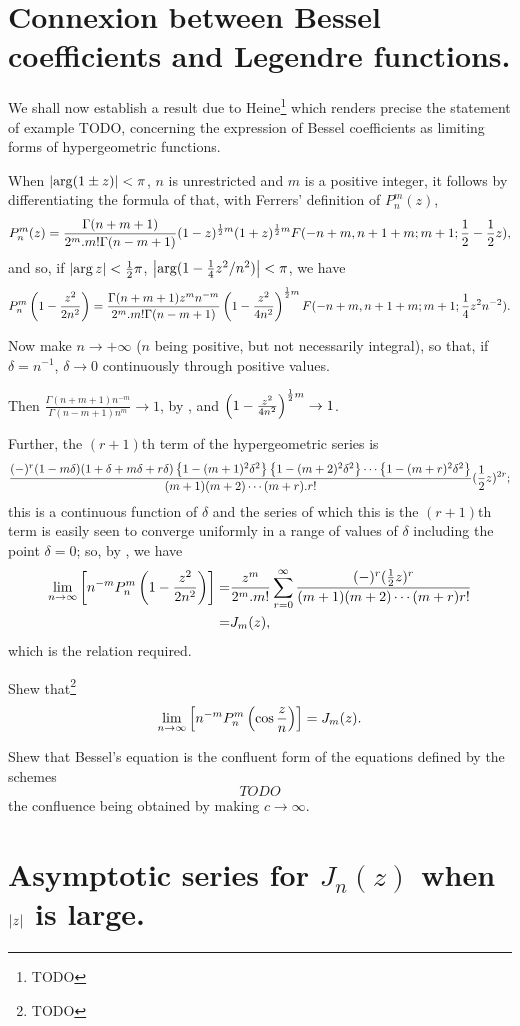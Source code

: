 \documentclass{book}
\begin{document}
\section{Connexion between Bessel coefficients and Legendre
  functions.}
We shall now establish a result due to Heine\footnote{TODO} which
renders precise the statement of  example
TODO, concerning the expression of Bessel coefficients as limiting
forms of hypergeometric functions.

When $\left| \arg(1\pm z) \right| < \pi$, $n$ is unrestricted and $m$ is a
positive integer, it follows by differentiating the formula of
 that, with Ferrers' definition of
$P_n^{m}(z)$,
$$
P_n^{m}(z)
=
\frac{\Gamma(n+m+1)}{2^m . m! \Gamma(n-m+1)}
(1-z)^{\frac{1}{2} m}
(1+z)^{\frac{1}{2} m}
F(-n+m,n+1+m; m+1; \frac{1}{2} - \frac{1}{2} z),
$$
and so, if $\left| \arg z \right| < \frac{1}{2}\pi$,
$\left| \arg (1 - \frac{1}{4} z^2/n^2) \right| < \pi$, we have
$$
P_n^{m}\left( 1 - \frac{z^2}{2n^2} \right)
=
\frac{\Gamma(n+m+1) z^m n^{-m}}{2^m . m! \Gamma(n-m+1)}
\left( 1 - \frac{z^2}{4n^2} \right)^{\frac{1}{2} m}
F(-n+m,n+1+m;m+1; \frac{1}{4} z^2 n^{-2}).
$$

Now make $n \rightarrow +\infty$ ($n$ being positive, but not
necessarily integral), so that, if $\delta = n^{-1}$, 
$\delta \rightarrow 0$ continuously through positive values.

Then
$ \frac{\Gamma(n+m+1)n^{-m}}{\Gamma(n-m+1) n^m} \rightarrow 1$,
by , and
$ \left( 1 - \frac{z^2}{4n^2} \right)^{\frac{1}{2} m} \rightarrow 1$.

Further, the $(r+1)$th term of the hypergeometric series is
$$
\frac{
  (-)^r
  (1-m\delta)
  (1+\delta+m\delta+r\delta)
  \left\{  1 - (m+1)^2 \delta^2  \right\}
  \left\{  1 - (m+2)^2 \delta^2  \right\}
  \cdots
  \left\{  1 - (m+r)^2 \delta^2  \right\}
}{ (m+1)(m+2)\cdots(m+r).r!}
(\frac{1}{2} z)^{2r};
$$
this is a continuous function of $\delta$ and the series of which this
is the $(r+1)$th term is easily seen to converge uniformly in a range
of values of $\delta$ including the point $\delta=0$; so, by
, we have
\begin{align*}
  \lim_{n \rightarrow \infty}
  \left[  n^{-m} P_n^{m}\left( 1 - \frac{z^2}{2n^2} \right) \right]
  =& \frac{z^m}{2^m.m!}
  \sum_{r=0}^{\infty} \frac{(-)^r (\frac{1}{2}
    z)^r}{(m+1)(m+2)\cdots(m+r)r!} \\
  =& J_m(z),
\end{align*}
which is the relation required.
\begin{wandwexample}
  Shew that\footnote{TODO}
  $$
  \lim_{n\rightarrow\infty}
  \left[  n^{-m} P_n^{m}\left( \cos \frac{z}{n} \right) \right] = J_m(z).
  $$
\end{wandwexample}
%
%
\begin{wandwexample}
  Shew that Bessel's equation is the confluent form of the equations
  defined by the schemes
  $$
  TODO
  $$
  the confluence being obtained by making $c \rightarrow \infty$.
\end{wandwexample}

\section{Asymptotic series for $J_n(z)$ when $\left| z \right|$ is large.}
\end{document}
